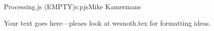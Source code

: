 \begin{aosachapter}{Processing.js (EMPTY)}{s:pjs}{Mike Kamermans}

Your text goes here---pleaes look at wesnoth.tex for formatting ideas.

\end{aosachapter}
